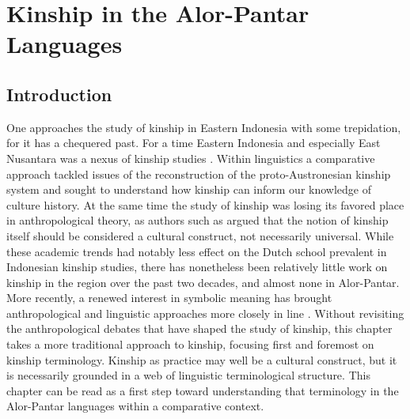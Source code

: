 

\chapter{Kinship in the Alor-Pantar Languages}
  
\section{Introduction}


\hypertarget{Toc376958238}{}
 


One approaches the study of kinship in Eastern Indonesia with some trepidation, for it has a chequered past. For a time Eastern Indonesia and especially East Nusantara was a nexus of kinship studies \citep[see][]{Fox1980,VanWouden1968}. Within linguistics a comparative approach tackled issues of the reconstruction of the proto-Austronesian kinship system and sought to understand how kinship can inform our knowledge of culture history. At the same time the study of kinship was losing its favored place in anthropological theory, as authors such as \citet{Schneider1984} argued that the notion of kinship itself should be considered a cultural construct, not necessarily universal. While these academic trends had notably less effect on the Dutch school prevalent in Indonesian kinship studies, there has nonetheless been relatively little work on kinship in the region over the past two decades, and almost none in Alor-Pantar. More recently, a renewed interest in symbolic meaning has brought anthropological and linguistic approaches more closely in line \citep[see][]{Schweitzer2000}. Without revisiting the anthropological debates that have shaped the study of kinship, this chapter takes a more traditional approach to kinship, focusing first and foremost on kinship terminology. Kinship as practice may well be a cultural construct, but it is necessarily grounded in a web of linguistic terminological structure. This chapter can be read as a first step toward understanding that terminology in the Alor-Pantar languages within a comparative context.

